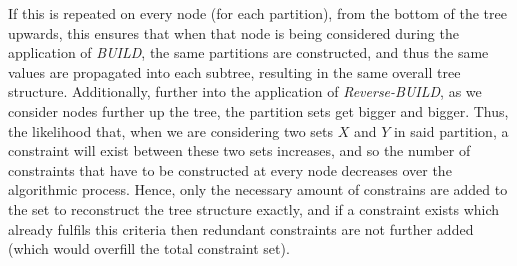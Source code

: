\documentclass[a4paper, 11pt]{article}
\begin{document}
	If this is repeated on every node (for each partition), from the bottom of the tree upwards, this ensures that when that node is being considered during the application of \emph{BUILD}, the same partitions are constructed, and thus the same values are propagated into each subtree, resulting in the same overall tree structure. Additionally, further into the application of \emph{Reverse-BUILD}, as we consider nodes further up the tree, the partition sets get bigger and bigger. Thus, the likelihood that, when we are considering two sets $X$ and $Y$ in said partition, a constraint will exist between these two sets increases, and so the number of constraints that have to be constructed at every node decreases over the algorithmic process. Hence, only the necessary amount of constrains are added to the set to reconstruct the tree structure exactly, and if a constraint exists which already fulfils this criteria then redundant constraints are not further added (which would overfill the total constraint set).
		
\end{document}
